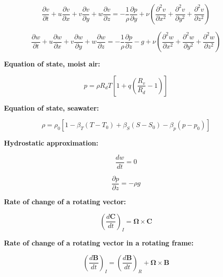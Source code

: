 \documentclass[12pt]{article}
\numberwithin{equation}{section}
\numberwithin{figure}{section}
\numberwithin{table}{section}
\begin{document}
\begin{equation}
  \frac{\partial v}{\partial t} + 
  u \frac{\partial v}{\partial x} + 
  v \frac{\partial v}{\partial y} + 
  w \frac{\partial v}{\partial z} = 
  - \frac{1}{\rho} \frac{\partial p}{\partial y} + \nu \left( \frac{\partial^2 v}{\partial x^2} + \frac{\partial^2 v}{\partial y^2} + \frac{\partial^2 v}{\partial z^2} \right)
\end{equation}

\begin{equation}
  \frac{\partial w}{\partial t} + 
  u \frac{\partial w}{\partial x} + 
  v \frac{\partial w}{\partial y} + 
  w \frac{\partial w}{\partial z} = 
  - \frac{1}{\rho} \frac{\partial p}{\partial z} - g + \nu \left( \frac{\partial^2 w}{\partial x^2} + \frac{\partial^2 w}{\partial y^2} + \frac{\partial^2 w}{\partial z^2} \right)
\end{equation}

\textbf{Equation of state, moist air:}

\begin{equation}
  p = \rho R_d T \left[1 + q \left(\frac{R_v}{R_d} - 1 \right) \right]
\end{equation}

\textbf{Equation of state, seawater:}

\begin{equation}
  \rho = \rho_0 \left[ 1 - \beta_T(T-T_0) + \beta_S(S-S_0) - \beta_p(p-p_0) \right]
\end{equation}

\textbf{Hydrostatic approximation:}

\begin{equation}
  \frac{dw}{dt} = 0
\end{equation}

\begin{equation}
  \frac{\partial p}{\partial z} = -\rho g
\end{equation}

\textbf{Rate of change of a rotating vector:}

\begin{equation}
  \left(\frac{d\mathbf{C}}{dt}\right)_I = \mathbf{\Omega} \times \mathbf{C}
\end{equation}

\textbf{Rate of change of a rotating vector in a rotating frame:}

\begin{equation}
  \left(\frac{d\mathbf{B}}{dt}\right)_I = \left(\frac{d\mathbf{B}}{dt}\right)_R + \mathbf{\Omega} \times \mathbf{B}
\end{equation}
\end{document}
